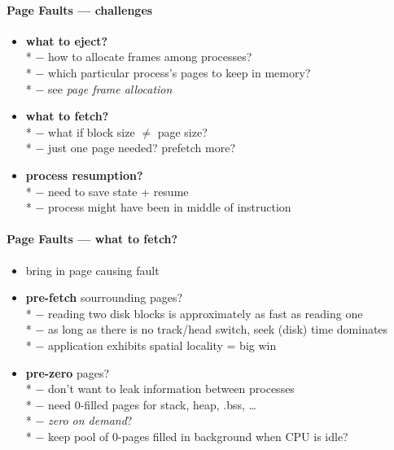 \paragraph{Page Faults --- challenges}
\begin{itemize}
  \item \textbf{what to eject?} \\*
    $ - $ how to allocate frames among processes? \\*
    $ - $ which particular process's pages to keep in memory? \\*
    $ - $ see \emph{page frame allocation}
  \item \textbf{what to fetch?} \\*
    $ - $ what if block size $ \neq $ page size? \\*
    $ - $ just one page needed? prefetch more?
  \item \textbf{process resumption?} \\*
    $ - $ need to save state + resume \\*
    $ - $ process might have been in middle of instruction
\end{itemize}

\paragraph{Page Faults --- what to fetch?}
\begin{itemize}
  \item bring in page causing fault
  \item \textbf{pre-fetch} sourrounding pages? \\*
    $ - $ reading two disk blocks is approximately as fast as reading one \\*
    $ - $ as long as there is no track/head switch, seek (disk) time dominates \\*
    $ - $ application exhibits spatial locality = big win
  \item \textbf{pre-zero} pages? \\*
    $ - $ don't want to leak information between processes \\*
    $ - $ need 0-filled pages for stack, heap, .bss, \dots \\*
    $ - $ \emph{zero on demand}? \\*
    $ - $ keep pool of 0-pages filled in background when CPU is idle?
\end{itemize}

